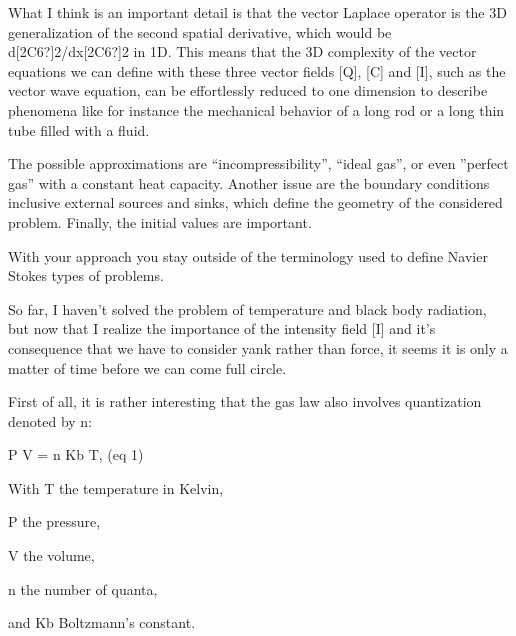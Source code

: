 \documentclass[a4paper]{article}
\newcommand\textstyleNone[1]{#1}
\begin{document}
{\color[rgb]{0.101960786,0.101960786,0.101960786}
\textstyleNone{What I think is an important detail is that the vector Laplace operator is the 3D generalization of the
second spatial derivative, which would be d[2C6?]2/dx[2C6?]2 in 1D. This means that the 3D complexity of the vector
equations we can define with these three vector fields [Q], [C] and [I], such as the vector wave equation, can be
effortlessly reduced to one dimension to describe phenomena like for instance the mechanical behavior of a long rod or
a long thin tube filled with a fluid.  }}

{\color[rgb]{0.101960786,0.101960786,0.101960786}
\textstyleNone{{\textquotedbl}The possible approximations are ``incompressibility'', ``ideal gas'', or even ''perfect
gas'' with a constant heat capacity. Another issue are the boundary conditions inclusive external sources and sinks,
which define the geometry of the considered problem. Finally, the initial values are important.}}

{\color[rgb]{0.101960786,0.101960786,0.101960786}
\textstyleNone{With your approach you stay outside of the terminology used to define Navier Stokes types of
problems.{\textquotedbl}}}

{\color[rgb]{0.101960786,0.101960786,0.101960786}
\textstyleNone{So far, I haven't solved the problem of temperature and black body radiation, but now that I realize the
importance of the intensity field [I] and it's consequence that we have to consider yank rather than force, it seems it
is only a matter of time before we can come full circle.}}

{\color[rgb]{0.101960786,0.101960786,0.101960786}
\textstyleNone{First of all, it is rather interesting that the gas law also involves quantization denoted by n:}}

{\color[rgb]{0.101960786,0.101960786,0.101960786}
\textstyleNone{P V = n Kb T, (eq 1)}}

{\color[rgb]{0.101960786,0.101960786,0.101960786}
\textstyleNone{With T the temperature in Kelvin,}}

{\color[rgb]{0.101960786,0.101960786,0.101960786}
\textstyleNone{P the pressure,}}

{\color[rgb]{0.101960786,0.101960786,0.101960786}
\textstyleNone{V the volume,}}

{\color[rgb]{0.101960786,0.101960786,0.101960786}
\textstyleNone{n the number of quanta,}}

{\color[rgb]{0.101960786,0.101960786,0.101960786}
\textstyleNone{and Kb Boltzmann's constant.}}
\end{document}
